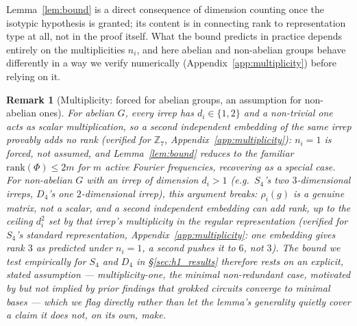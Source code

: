 \documentclass{article}
\newtheorem{remark}{Remark}
\begin{document}
Lemma~\ref{lem:bound} is a direct consequence of dimension counting once the
isotypic hypothesis is granted; its content is in connecting rank to
representation type at all, not in the proof itself. What the bound predicts
in practice depends entirely on the multiplicities $n_i$, and here abelian
and non-abelian groups behave differently in a way we verify numerically
(Appendix~\ref{app:multiplicity}) before relying on it.

\begin{remark}[Multiplicity: forced for abelian groups, an assumption for
non-abelian ones]
\label{rem:multiplicity}
For abelian $G$, every irrep has $d_i\in\{1,2\}$ and a non-trivial one acts
as scalar multiplication, so a second independent embedding of the same
irrep provably adds no rank (verified for $\mathbb{Z}_7$,
Appendix~\ref{app:multiplicity}): $n_i=1$ is \emph{forced}, not assumed,
and Lemma~\ref{lem:bound} reduces to the familiar
$\mathrm{rank}(\Phi)\le 2m$ for $m$ active Fourier frequencies, recovering
\citet{nanda2023progress} as a special case. For non-abelian $G$ with an
irrep of dimension $d_i>1$ (e.g.\ $S_4$'s two $3$-dimensional irreps,
$D_4$'s one $2$-dimensional irrep), this argument breaks: $\rho_i(g)$ is a
genuine matrix, not a scalar, and a second independent embedding
\emph{can} add rank, up to the ceiling $d_i^2$ set by that irrep's
multiplicity in the regular representation (verified for $S_4$'s standard
representation, Appendix~\ref{app:multiplicity}: one embedding gives rank
$3$ as predicted under $n_i=1$, a second pushes it to $6$, not $3$). The
bound we test empirically for $S_4$ and $D_4$ in \S\ref{sec:h1_results}
therefore rests on an explicit, stated assumption --- multiplicity-one,
the minimal non-redundant case, motivated by but not implied by prior
findings that grokked circuits converge to minimal bases
\citep{nanda2023progress,chughtai2023toy} --- which we flag directly
rather than let the lemma's generality quietly cover a claim it does not,
on its own, make.
\end{remark}
\end{document}
